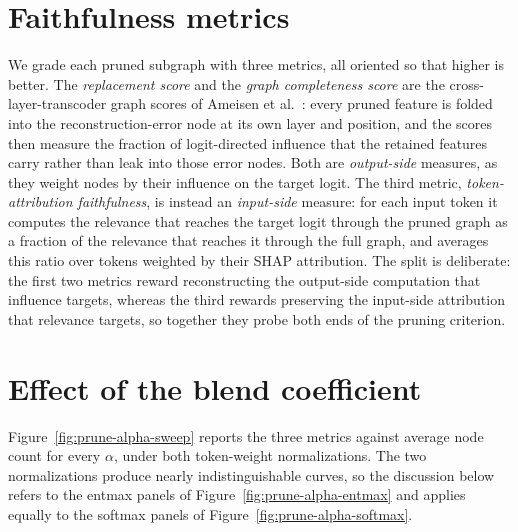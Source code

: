 \documentclass[../main.tex]{subfiles}
\begin{document}
\section{Faithfulness metrics}
We grade each pruned subgraph with three metrics, all oriented so that higher is
better. The \emph{replacement score} and the \emph{graph completeness score} are
the cross-layer-transcoder graph scores of Ameisen et
al.~\cite{ameisen2025circuit}: every pruned feature is folded into the
reconstruction-error node at its own layer and position, and the scores then
measure the fraction of logit-directed influence that the retained features carry
rather than leak into those error nodes. Both are \emph{output-side} measures, as
they weight nodes by their influence on the target logit. The third metric,
\emph{token-attribution faithfulness}, is instead an \emph{input-side} measure: for
each input token it computes the relevance that reaches the target logit through
the pruned graph as a fraction of the relevance that reaches it through the full
graph, and averages this ratio over tokens weighted by their SHAP attribution. The
split is deliberate: the first two metrics reward reconstructing the output-side
computation that influence targets, whereas the third rewards preserving the
input-side attribution that relevance targets, so together they probe both ends of
the pruning criterion.

\section{Effect of the blend coefficient}
Figure~\ref{fig:prune-alpha-sweep} reports the three metrics against average node
count for every $\alpha$, under both token-weight normalizations. The two
normalizations produce nearly indistinguishable curves, so the discussion below
refers to the entmax panels of Figure~\ref{fig:prune-alpha-entmax} and applies
equally to the softmax panels of Figure~\ref{fig:prune-alpha-softmax}.
\end{document}
